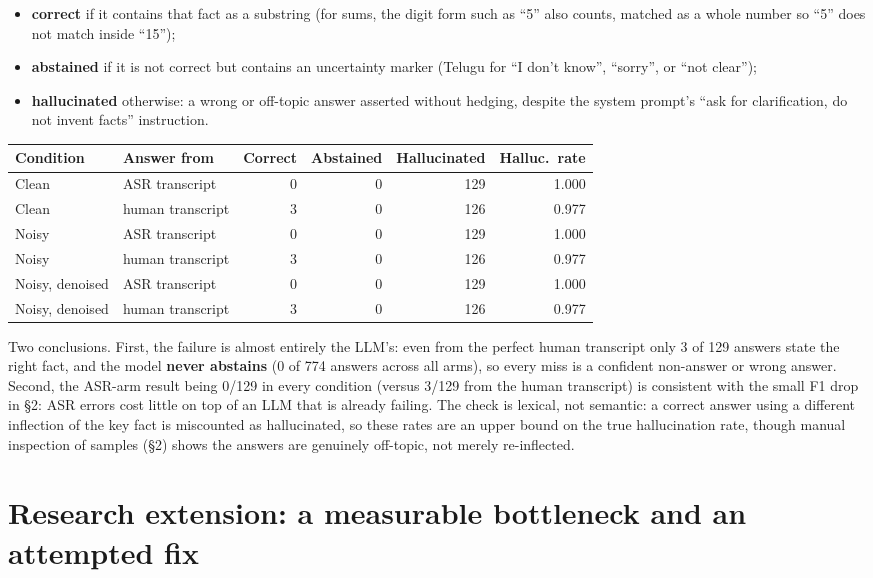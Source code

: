 \documentclass[11pt]{article}
\begin{document}
\begin{itemize}[leftmargin=1.4em]
\item \textbf{correct} if it contains that fact as a substring (for sums, the digit form such as ``5'' also counts, matched as a whole number so ``5'' does not match inside ``15'');
\item \textbf{abstained} if it is not correct but contains an uncertainty marker (Telugu for ``I don't know'', ``sorry'', or ``not clear'');
\item \textbf{hallucinated} otherwise: a wrong or off-topic answer asserted without hedging, despite the system prompt's ``ask for clarification, do not invent facts'' instruction.
\end{itemize}

\begin{center}
\begin{tabular}{llrrrr}
\toprule
Condition & Answer from & Correct & Abstained & Hallucinated & Halluc.\ rate \\
\midrule
Clean & ASR transcript & 0 & 0 & 129 & 1.000 \\
Clean & human transcript & 3 & 0 & 126 & 0.977 \\
Noisy & ASR transcript & 0 & 0 & 129 & 1.000 \\
Noisy & human transcript & 3 & 0 & 126 & 0.977 \\
Noisy, denoised & ASR transcript & 0 & 0 & 129 & 1.000 \\
Noisy, denoised & human transcript & 3 & 0 & 126 & 0.977 \\
\bottomrule
\end{tabular}
\end{center}

Two conclusions. First, the failure is almost entirely the LLM's: even from the perfect human transcript only 3 of 129 answers state the right fact, and the model \textbf{never abstains} (0 of 774 answers across all arms), so every miss is a confident non-answer or wrong answer. Second, the ASR-arm result being 0/129 in every condition (versus 3/129 from the human transcript) is consistent with the small F1 drop in \S2: ASR errors cost little on top of an LLM that is already failing. The check is lexical, not semantic: a correct answer using a different inflection of the key fact is miscounted as hallucinated, so these rates are an upper bound on the true hallucination rate, though manual inspection of samples (\S2) shows the answers are genuinely off-topic, not merely re-inflected.

\section{Research extension: a measurable bottleneck and an attempted fix}
\end{document}
